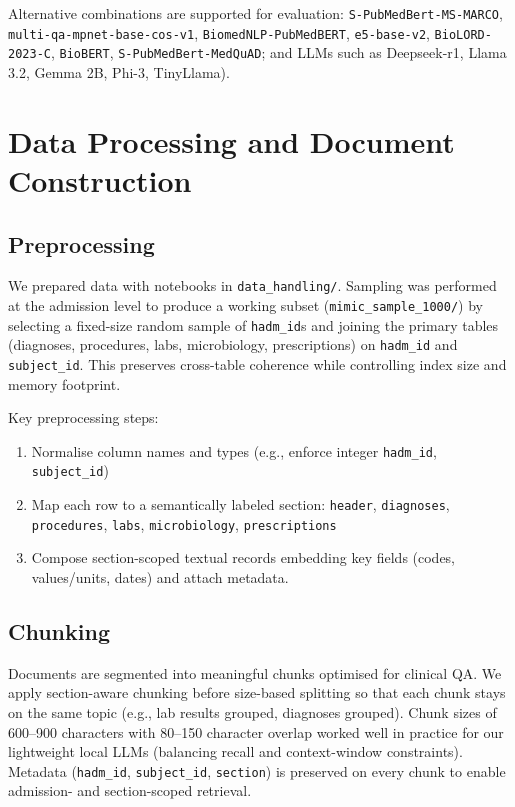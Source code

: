 Alternative combinations are supported for evaluation: \texttt{S-PubMedBert-MS-MARCO}, \texttt{multi-qa-mpnet-base-cos-v1}, \texttt{BiomedNLP-PubMedBERT}, \texttt{e5-base-v2}, \texttt{BioLORD-2023-C}, \texttt{BioBERT}, \texttt{S-PubMedBert-MedQuAD}; and LLMs such as Deepseek-r1, Llama 3.2, Gemma 2B, Phi-3, TinyLlama).

\section{Data Processing and Document Construction}

\subsection{Preprocessing}
We prepared data with notebooks in \texttt{data\_handling/}. Sampling was performed at the admission level to produce a working subset (\texttt{mimic\_sample\_1000/}) by selecting a fixed-size random sample of \texttt{hadm\_id}s and joining the primary tables (diagnoses, procedures, labs, microbiology, prescriptions) on \texttt{hadm\_id} and \texttt{subject\_id}. This preserves cross-table coherence while controlling index size and memory footprint.

\noindent Key preprocessing steps:
\begin{enumerate}
  \item Normalise column names and types (e.g., enforce integer \texttt{hadm\_id}, \texttt{subject\_id})
  \item Map each row to a semantically labeled section: \texttt{header}, \texttt{diagnoses}, \texttt{procedures}, \texttt{labs}, \texttt{microbiology}, \texttt{prescriptions}
  \item Compose section-scoped textual records embedding key fields (codes, values/units, dates) and attach metadata.
\end{enumerate}

\subsection{Chunking}
Documents are segmented into meaningful chunks optimised for clinical QA. We apply section-aware chunking before size-based splitting so that each chunk stays on the same topic (e.g., lab results grouped, diagnoses grouped). Chunk sizes of 600--900 characters with 80--150 character overlap worked well in practice for our lightweight local LLMs (balancing recall and context-window constraints). Metadata (\texttt{hadm\_id}, \texttt{subject\_id}, \texttt{section}) is preserved on every chunk to enable admission- and section-scoped retrieval.

